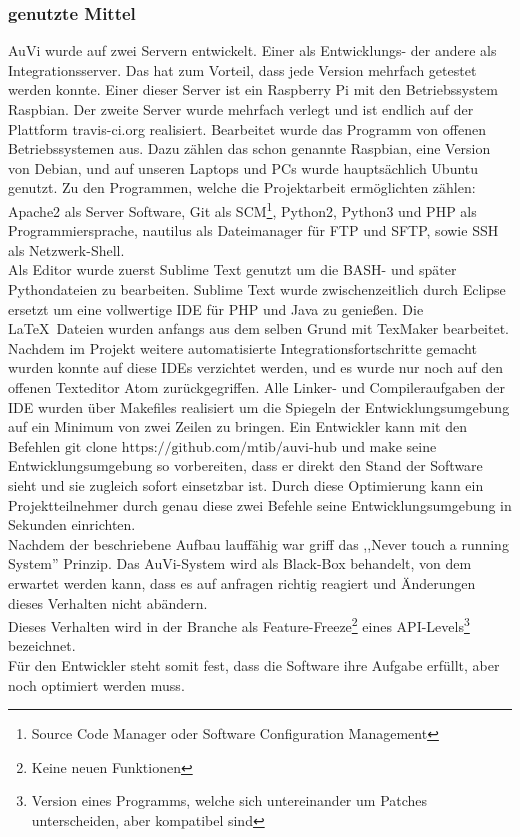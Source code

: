 \subsubsection{genutzte Mittel} %
AuVi wurde auf zwei Servern entwickelt.
Einer als Entwicklungs- der andere als Integrationsserver.
Das hat zum Vorteil, dass jede Version mehrfach getestet werden konnte.
Einer dieser Server ist ein Raspberry Pi mit den Betriebssystem Raspbian.
Der zweite Server wurde mehrfach verlegt und
ist endlich auf der Plattform travis-ci.org realisiert.
Bearbeitet wurde das Programm von offenen Betriebssystemen aus.
Dazu zählen das schon genannte
Raspbian, eine Version von Debian,
und auf unseren Laptops und PCs wurde hauptsächlich Ubuntu genutzt.
Zu den Programmen, welche die Projektarbeit ermöglichten zählen: Apache2 als Server
Software, Git als SCM\footnote{Source Code Manager oder Software Configuration Management},
Python2, Python3 und PHP als Programmiersprache,
nautilus als Dateimanager für FTP und SFTP, sowie
SSH als Netzwerk-Shell.\\
Als Editor wurde zuerst Sublime Text genutzt
um die BASH- und später Pythondateien zu bearbeiten.
Sublime Text wurde zwischenzeitlich durch Eclipse
ersetzt um eine vollwertige IDE für PHP und Java zu
genießen. Die \LaTeX\ Dateien wurden anfangs aus dem selben Grund mit TexMaker bearbeitet.
Nachdem im Projekt weitere automatisierte Integrationsfortschritte gemacht wurden konnte auf
diese IDEs verzichtet werden,
und es wurde nur noch auf den offenen Texteditor Atom zurückgegriffen.
Alle Linker- und Compileraufgaben der IDE wurden über Makefiles realisiert um die Spiegeln der
Entwicklungsumgebung auf ein Minimum von zwei Zeilen zu bringen. Ein Entwickler kann mit den
Befehlen $\text{git clone https://github.com/mtib/auvi-hub}$ und $\text{make}$ seine Entwicklungsumgebung
so vorbereiten, dass er direkt den Stand der Software sieht und sie zugleich sofort einsetzbar ist.
Durch diese Optimierung kann ein Projektteilnehmer durch genau diese zwei Befehle seine Entwicklungsumgebung
in Sekunden einrichten.\\
Nachdem der beschriebene Aufbau lauffähig war griff das ,,Never touch a running System'' Prinzip.
Das AuVi-System wird als Black-Box behandelt, von dem erwartet werden kann, dass es auf anfragen
richtig reagiert und Änderungen dieses Verhalten nicht abändern.\\
Dieses Verhalten wird in der Branche als Feature-Freeze\footnote{Keine neuen Funktionen}
eines API-Levels\footnote{Version eines Programms, welche sich untereinander um Patches unterscheiden,
aber kompatibel sind} \cite{semver} bezeichnet.\\
Für den Entwickler steht somit fest, dass die Software ihre Aufgabe erfüllt, aber noch optimiert
werden muss.

